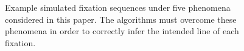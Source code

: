 \documentclass[doc,biblatex]{apa7}
\begin{document}
	\begin{figure}
	\vspace*{2pt}
	\caption{Example simulated fixation sequences under five phenomena considered in this paper. The algorithms must overcome these phenomena in order to correctly infer the intended line of each fixation.}
	\label{fig04}
	\end{figure}
\end{document}
